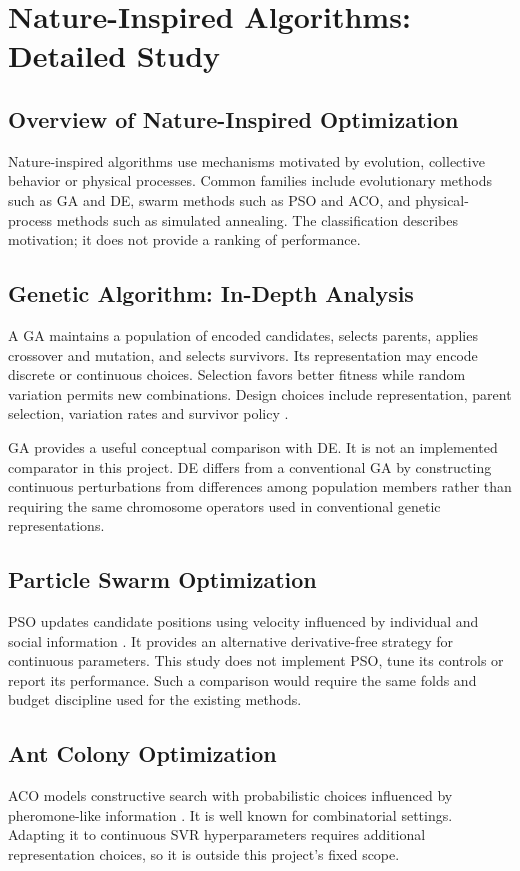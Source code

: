 \chapter{Nature-Inspired Algorithms: Detailed Study}
\section{Overview of Nature-Inspired Optimization}
Nature-inspired algorithms use mechanisms motivated by evolution, collective behavior or physical processes. Common families include evolutionary methods such as GA and DE, swarm methods such as PSO and ACO, and physical-process methods such as simulated annealing. The classification describes motivation; it does not provide a ranking of performance.
\section{Genetic Algorithm: In-Depth Analysis}
A GA maintains a population of encoded candidates, selects parents, applies crossover and mutation, and selects survivors. Its representation may encode discrete or continuous choices. Selection favors better fitness while random variation permits new combinations. Design choices include representation, parent selection, variation rates and survivor policy \cite{holland}.

GA provides a useful conceptual comparison with DE. It is not an implemented comparator in this project. DE differs from a conventional GA by constructing continuous perturbations from differences among population members rather than requiring the same chromosome operators used in conventional genetic representations.
\section{Particle Swarm Optimization}
PSO updates candidate positions using velocity influenced by individual and social information \cite{pso}. It provides an alternative derivative-free strategy for continuous parameters. This study does not implement PSO, tune its controls or report its performance. Such a comparison would require the same folds and budget discipline used for the existing methods.
\section{Ant Colony Optimization}
ACO models constructive search with probabilistic choices influenced by pheromone-like information \cite{aco}. It is well known for combinatorial settings. Adapting it to continuous SVR hyperparameters requires additional representation choices, so it is outside this project's fixed scope.
